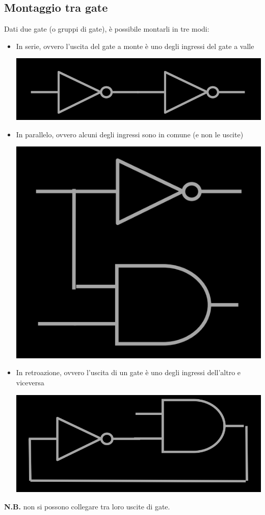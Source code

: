 \documentclass{article}
\begin{document}
\subsection{Montaggio tra gate}
Dati due gate (o gruppi di gate), è possibile montarli in tre modi:
\begin{itemize}
    \item In serie, ovvero l’uscita del gate a monte è uno degli ingressi del gate a valle
    \begin{center}
        \includegraphics[scale=0.35]{gateinserie.png}
    \end{center}
    \item In parallelo, ovvero alcuni degli ingressi sono in comune (e non le uscite)
    \begin{center}
        \includegraphics[scale=0.35]{gateinparallelo.png}
    \end{center}
    \item In retroazione, ovvero l’uscita di un gate è uno degli ingressi dell’altro e viceversa
    \begin{center}
        \includegraphics[scale=0.35]{gateinretro.png}
    \end{center}
\end{itemize}
\textbf{N.B.} non si possono collegare tra loro uscite di gate.
\end{document}
